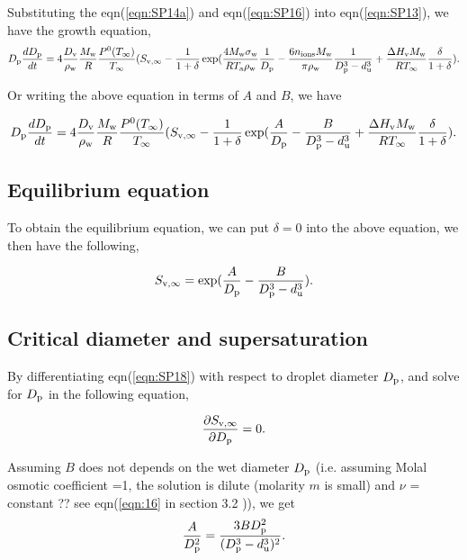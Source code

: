 \documentclass[12pt]{article}
\begin{document}
Substituting the eqn(\ref{eqn:SP14a}) and eqn(\ref{eqn:SP16}) into eqn(\ref{eqn:SP13}), we have
the growth equation, 
\begin{equation}\label{eqn:SP17a}
D_{\rm p}\frac{dD_{\rm p}}{dt}=4 \frac{D_{\rm v}} {\rho_{\rm w}} \frac{M_{\rm w}}{R} \frac{P^{\rm 0}(T_{\infty})} {T_{\infty}} (S_{\rm v, \infty} - \frac{1}{1+\delta} \exp(\frac{4 M_{\rm w}\sigma_{\rm w}}{R T_{\rm a} \rho_{\rm w}}\frac{1}{D_{\rm p}}-\frac{6 n_{\rm ions} M_{\rm w}}{\pi \rho_{\rm w}} \frac{1}{D_{\rm p}^{3}-d_{\rm u}^{3}}+\frac{\Delta H_{\rm v} M_{\rm w}}{R T_{\infty}} \frac{\delta}{1+\delta}).
\end{equation}

Or writing the above equation in terms of  $A$ and $B$, we have

\begin{equation}\label{eqn:17b}
D_{\rm p}\frac{dD_{\rm p}}{dt}=4 \frac{D_{\rm v}} {\rho_{\rm w}} \frac{M_{\rm w}}{R} \frac{P^{\rm 0}(T_{\infty})} {T_{\infty}} (S_{\rm v, \infty} - \frac{1}{1+\delta} \exp(\frac{A}{D_{\rm p}}- \frac{B}{D_{\rm p}^{3}-d_{\rm u}^{3}}+\frac{\Delta H_{\rm v} M_{\rm w}}{R T_{\infty}} \frac{\delta}{1+\delta}).
\end{equation}
\subsection{Equilibrium equation}
To obtain the equilibrium equation, we can put $\delta=0$ into the above equation,  we then have the following,

\begin{equation}\label{eqn:SP18}
S_{\rm v, \infty} = \exp(\frac{A}{D_{\rm p}}- \frac{B}{D_{\rm p}^{3}-d_{\rm u}^{3}}).
\end{equation}


\subsection{Critical diameter and supersaturation} 

By differentiating eqn(\ref{eqn:SP18}) with respect to droplet diameter $D_{\rm p}$, and solve for $D_{\rm p}$ in the following equation,  

\begin{equation}\label{eqn:SP19}
\frac{\partial S_{\rm v, \infty}}{\partial D_{\rm p}}=0.
\end{equation}

Assuming $B$ does not depends on the wet diameter $D_{\rm p}$ (i.e. assuming Molal osmotic coefficient =1, the solution is dilute (molarity $m$ is small) and $\nu$ = constant ?? see eqn(\ref{eqn:16} in section 3.2 )),  we get
\begin{equation}\label{eqn:SP20}
\frac{A}{D_{\rm p}^{2}}=\frac{3 B D_{\rm p}^{2}}{(D_{\rm p}^{3}- d_{\rm u}^{3})^{2}}.
\end{equation} 
\end{document}
